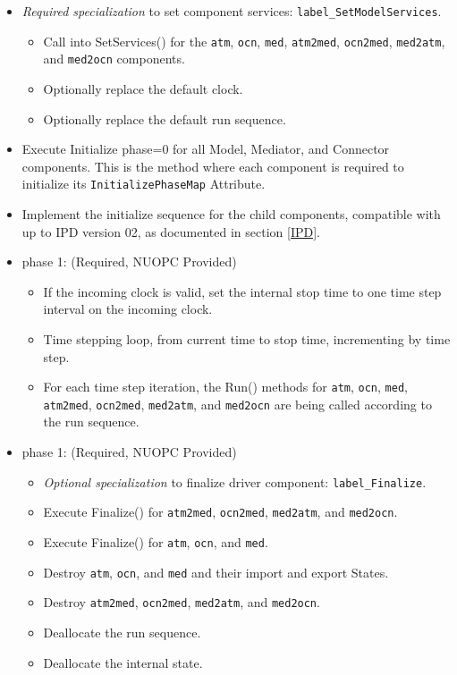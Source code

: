 \begin{itemize}
\begin{itemize}
  \item {\it Required specialization} to set component services: {\tt label\_SetModelServices}. 
  \begin{itemize}
    \item Call into SetServices() for the {\tt atm}, {\tt ocn}, {\tt med}, {\tt atm2med}, {\tt ocn2med}, {\tt med2atm}, and {\tt med2ocn} components.
    \item Optionally replace the default clock. 
    \item Optionally replace the default run sequence.
  \end{itemize}
  \item Execute Initialize phase=0 for all Model, Mediator, and Connector components. This is the method where each component is required to initialize its {\tt InitializePhaseMap} Attribute.
  \item Implement the initialize sequence for the child components, compatible with up to IPD version 02, as documented in section \ref{IPD}.
  \end{itemize}  
\end{itemize}

\begin{itemize}
\item phase 1: ({\sc Required, NUOPC Provided})
  \begin{itemize}
  \item If the incoming clock is valid, set the internal stop time to one time step interval on the incoming clock.
  \item Time stepping loop, from current time to stop time, incrementing by time step.
  \item For each time step iteration, the Run() methods for {\tt atm}, {\tt ocn}, {\tt med}, {\tt atm2med}, {\tt ocn2med}, {\tt med2atm}, and {\tt med2ocn} are being called according to the run sequence.
  \end{itemize}    
\end{itemize}

\begin{itemize}
\item phase 1: ({\sc Required, NUOPC Provided})
  \begin{itemize}
  \item {\it Optional specialization} to finalize driver component: {\tt label\_Finalize}.
  \item Execute Finalize() for {\tt atm2med}, {\tt ocn2med}, {\tt med2atm}, and {\tt med2ocn}.
  \item Execute Finalize() for {\tt atm}, {\tt ocn}, and {\tt med}.
  \item Destroy {\tt atm}, {\tt ocn}, and {\tt med} and their import and export States.
  \item Destroy {\tt atm2med}, {\tt ocn2med}, {\tt med2atm}, and {\tt med2ocn}.
  \item Deallocate the run sequence.
  \item Deallocate the internal state.
  \end{itemize}      
\end{itemize}

